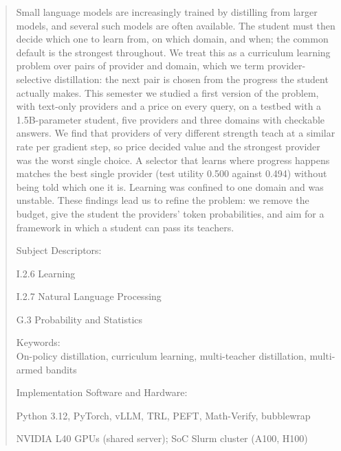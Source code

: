 \begin{abstract}
\noindent
Small language models are increasingly trained by distilling from larger models, and
several such models are often available. The student must then decide which one to learn
from, on which domain, and when; the common default is the strongest throughout. We treat
this as a curriculum learning problem over pairs of provider and domain, which we term
provider-selective distillation: the next pair is chosen from the progress the student
actually makes. This semester we studied a first version of the problem, with text-only
providers and a price on every query, on a testbed with a 1.5B-parameter student, five
providers and three domains with checkable answers. We
find that providers of very different strength teach at a similar rate per gradient step,
so price decided value and the strongest provider was the worst single
choice. A selector that learns where progress happens matches the best single provider
(test utility 0.500 against 0.494) without being told which one it is. Learning was
confined to one domain and was unstable. These findings lead us to refine the problem: we
remove the budget, give the student the providers' token probabilities, and aim for a
framework in which a student can pass its teachers.

\vspace{5mm}
Subject Descriptors:
\begin{list}{\quad}{}
    \item I.2.6 Learning
    \item I.2.7 Natural Language Processing
    \item G.3 Probability and Statistics
\end{list}

Keywords: \\
\tab On-policy distillation, curriculum learning, multi-teacher distillation,
multi-armed bandits

Implementation Software and Hardware:
\begin{list}{\quad}{}
    \item Python 3.12, PyTorch, vLLM, TRL, PEFT, Math-Verify, bubblewrap
    \item NVIDIA L40 GPUs (shared server); SoC Slurm cluster (A100, H100)
\end{list}
\end{abstract}
\pagebreak
